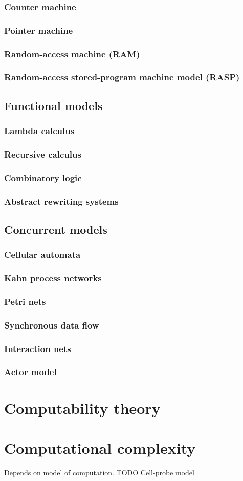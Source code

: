 \subsubsection{Counter machine}
\subsubsection{Pointer machine}
\subsubsection{Random-access machine (RAM)}
\subsubsection{Random-access stored-program machine model (RASP)}
\subsection{Functional models}
\subsubsection{Lambda calculus}
\subsubsection{Recursive calculus}
\subsubsection{Combinatory logic}
\subsubsection{Abstract rewriting systems}
\subsection{Concurrent models}
\subsubsection{Cellular automata}
\subsubsection{Kahn process networks}
\subsubsection{Petri nets}
\subsubsection{Synchronous data flow}
\subsubsection{Interaction nets}
\subsubsection{Actor model}
\section{Computability theory}
\section{Computational complexity}
Depends on model of computation. TODO Cell-probe model